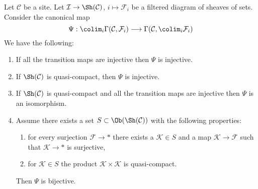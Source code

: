 \begin{lemma}
\label{lemma-directed-colimits-global-sections}
Let $\mathcal{C}$ be a site. Let
$\mathcal{I} \to \Sh(\mathcal{C})$, $i \mapsto \mathcal{F}_i$
be a filtered diagram of sheaves of sets.
Consider the canonical map
$$
\Psi :
\colim_i \Gamma(\mathcal{C}, \mathcal{F}_i)
\longrightarrow
\Gamma(\mathcal{C}, \colim_i \mathcal{F}_i)
$$
We have the following:
\begin{enumerate}
\item If all the transition maps are injective then $\Psi$ is injective.
\item If $\Sh(\mathcal{C})$ is quasi-compact, then $\Psi$ is injective.
\item If $\Sh(\mathcal{C})$ is quasi-compact and all the transition maps
are injective then $\Psi$ is an isomorphism.
\item Assume there exists a set $S \subset \Ob(\Sh(\mathcal{C}))$
with the following properties:
\begin{enumerate}
\item for every surjection $\mathcal{F} \to *$ there exists a
$\mathcal{K} \in S$ and a map $\mathcal{K} \to \mathcal{F}$
such that $\mathcal{K} \to *$ is surjective,
\item for $\mathcal{K} \in S$ the product
$\mathcal{K} \times \mathcal{K}$ is quasi-compact.
\end{enumerate}
Then $\Psi$ is bijective.
\end{enumerate}
\end{lemma}

